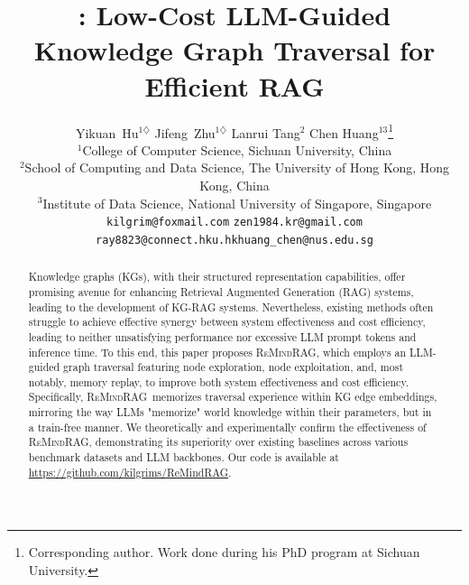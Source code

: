 \documentclass{article}
\title{\ours: Low-Cost LLM-Guided Knowledge Graph Traversal for Efficient RAG}
\author{
  Yikuan~Hu$^{1\diamondsuit}$ \quad Jifeng~Zhu$^{1\diamondsuit}$ \quad Lanrui Tang$^{2}$ \quad Chen Huang$^{13}$\thanks{Corresponding author. Work done during his PhD program at Sichuan University.}
  \\
  $^1$College of Computer Science, Sichuan University, China\\
  $^2$School of Computing and Data Science, The University of Hong Kong, Hong Kong, China\\
  $^3$Institute of Data Science, National University of Singapore, Singapore\\
  \texttt{kilgrim@foxmail.com} \quad \texttt{zen1984.kr@gmail.com}\\
  \texttt{ray8823@connect.hku.hk}\quad \texttt{huang\_chen@nus.edu.sg}
}
\newcommand{\ours}{\textsc{ReMindRAG}}
\begin{document}

\maketitle
\def\thefootnote{$\diamondsuit$}\def\thefootnote{\arabic{footnote}}


\begin{abstract}
Knowledge graphs (KGs), with their structured representation capabilities, offer promising avenue for enhancing Retrieval Augmented Generation (RAG) systems, leading to the development of KG-RAG systems. Nevertheless, existing methods often struggle to achieve effective synergy between system effectiveness and cost efficiency, leading to neither unsatisfying performance nor excessive LLM prompt tokens and inference time. To this end, this paper proposes \ours, which employs an LLM-guided graph traversal featuring node exploration, node exploitation, and, most notably, memory replay, to improve both system effectiveness and cost efficiency. Specifically, \ours~memorizes traversal experience within KG edge embeddings, mirroring the way LLMs "memorize" world knowledge within their parameters, but in a train-free manner. We theoretically and experimentally confirm the effectiveness of \ours, demonstrating its superiority over existing baselines across various benchmark datasets and LLM backbones. Our code is available at \url{https://github.com/kilgrims/ReMindRAG}.

\end{abstract}














\clearpage

 





\clearpage
\appendix














% 
\end{document}
